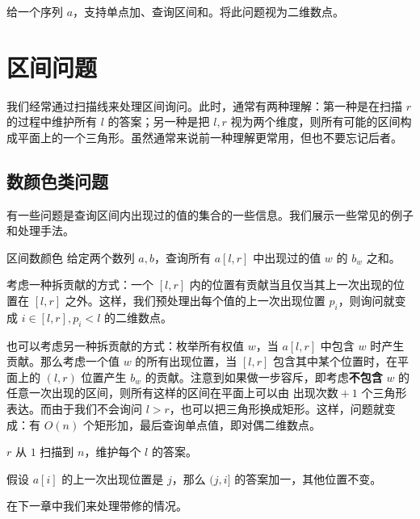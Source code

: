 \begin{example}[序列 $\times$ 时间]
    给一个序列 $a$，支持单点加、查询区间和。将此问题视为二维数点。
\end{example}

\section{区间问题}

我们经常通过扫描线来处理区间询问。此时，通常有两种理解：第一种是在扫描 $r$ 的过程中维护所有 $l$ 的答案；另一种是把 $l,r$ 视为两个维度，则所有可能的区间构成平面上的一个三角形。虽然通常来说前一种理解更常用，但也不要忘记后者。

\subsection{数颜色类问题}

有一些问题是查询区间内出现过的值的集合的一些信息。我们展示一些常见的例子和处理手法。

\begin{example}{区间数颜色}
    给定两个数列 $a,b$，查询所有 $a[l,r]$ 中出现过的值 $w$ 的 $b_w$ 之和。
\end{example}
\begin{solution}[做法一]
    考虑一种拆贡献的方式：一个 $[l,r]$ 内的位置有贡献当且仅当其上一次出现的位置在 $[l,r]$ 之外。这样，我们预处理出每个值的上一次出现位置 $p_i$，则询问就变成 $i\in[l,r],p_i<l$ 的二维数点。
\end{solution}
\begin{solution}[做法二]
    也可以考虑另一种拆贡献的方式：枚举所有权值 $w$，当 $a[l,r]$ 中包含 $w$ 时产生贡献。那么考虑一个值 $w$ 的所有出现位置，当 $[l,r]$ 包含其中某个位置时，在平面上的 $(l,r)$ 位置产生 $b_w$ 的贡献。注意到如果做一步容斥，即考虑\textbf{不包含} $w$ 的任意一次出现的区间，则所有这样的区间在平面上可以由 $\text{出现次数}+1$ 个三角形表达。而由于我们不会询问 $l>r$，也可以把三角形换成矩形。这样，问题就变成：有 $O(n)$ 个矩形加，最后查询单点值，即对偶二维数点。
\end{solution}
\begin{solution}[做法三]
    $r$ 从 $1$ 扫描到 $n$，维护每个 $l$ 的答案。

    假设 $a[i]$ 的上一次出现位置是 $j$，那么 $(j,i]$ 的答案加一，其他位置不变。
\end{solution}
\begin{remark}
    在下一章中我们来处理带修的情况。
\end{remark}

